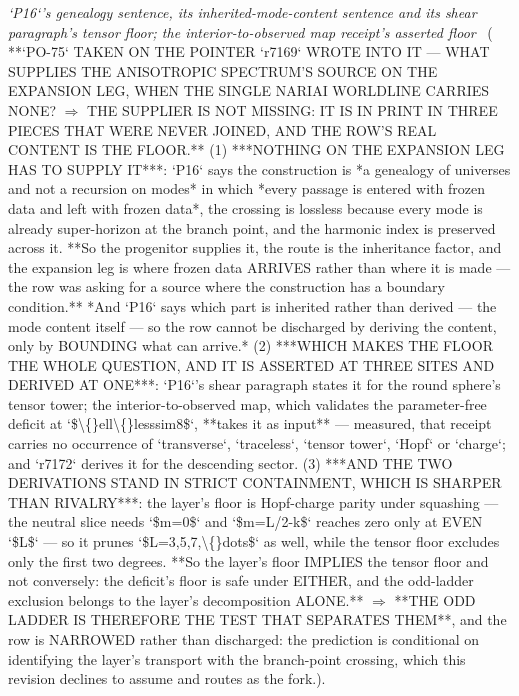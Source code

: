 \begin{description}
\textit{`P16`'s genealogy sentence, its inherited-mode-content sentence and its shear paragraph's tensor floor; the interior-to-observed map receipt's asserted floor} \ ( **`PO-75` TAKEN ON THE POINTER `r7169` WROTE INTO IT --- WHAT SUPPLIES THE ANISOTROPIC SPECTRUM'S SOURCE ON THE EXPANSION LEG, WHEN THE SINGLE NARIAI WORLDLINE CARRIES NONE? \ensuremath{\Rightarrow} THE SUPPLIER IS NOT MISSING: IT IS IN PRINT IN THREE PIECES THAT WERE NEVER JOINED, AND THE ROW'S REAL CONTENT IS THE FLOOR.** (1) ***NOTHING ON THE EXPANSION LEG HAS TO SUPPLY IT***: `P16` says the construction is *a genealogy of universes and not a recursion on modes* in which *every passage is entered with frozen data and left with frozen data*, the crossing is lossless because every mode is already super-horizon at the branch point, and the harmonic index is preserved across it. **So the progenitor supplies it, the route is the inheritance factor, and the expansion leg is where frozen data ARRIVES rather than where it is made --- the row was asking for a source where the construction has a boundary condition.**  *And `P16` says which part is inherited rather than derived --- the mode content itself --- so the row cannot be discharged by deriving the content, only by BOUNDING what can arrive.* (2) ***WHICH MAKES THE FLOOR THE WHOLE QUESTION, AND IT IS ASSERTED AT THREE SITES AND DERIVED AT ONE***: `P16`'s shear paragraph states it for the round sphere's tensor tower; the interior-to-observed map, which validates the parameter-free deficit at `\$\textbackslash\{\}ell\textbackslash\{\}lesssim8\$`, **takes it as input** --- measured, that receipt carries no occurrence of `transverse`, `traceless`, `tensor tower`, `Hopf` or `charge`; and `r7172` derives it for the descending sector. (3) ***AND THE TWO DERIVATIONS STAND IN STRICT CONTAINMENT, WHICH IS SHARPER THAN RIVALRY***: the layer's floor is Hopf-charge parity under squashing --- the neutral slice needs `\$m=0\$` and `\$m=L/2-k\$` reaches zero only at EVEN `\$L\$` --- so it prunes `\$L=3,5,7,\textbackslash\{\}dots\$` as well, while the tensor floor excludes only the first two degrees. **So the layer's floor IMPLIES the tensor floor and not conversely: the deficit's floor is safe under EITHER, and the odd-ladder exclusion belongs to the layer's decomposition ALONE.** \ensuremath{\Rightarrow} **THE ODD LADDER IS THEREFORE THE TEST THAT SEPARATES THEM**, and the row is NARROWED rather than discharged: the prediction is conditional on identifying the layer's transport with the branch-point crossing, which this revision declines to assume and routes as the fork.). 

\end{description}
